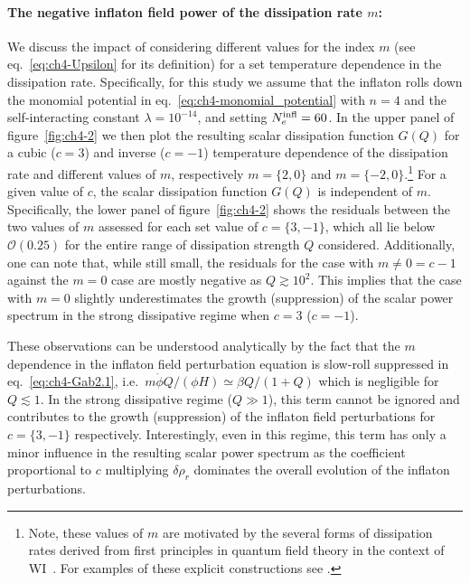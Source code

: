 \paragraph{The negative inflaton field power of the dissipation rate $m$:}
We discuss the impact of considering different values for the index $m$ (see eq.~\eqref{eq:ch4-Upsilon} for its definition) for a set temperature dependence in the dissipation rate.
Specifically, for this study we assume that the inflaton rolls down the monomial potential in eq.~\eqref{eq:ch4-monomial_potential} with $n=4$ and the self-interacting constant $\lambda=10^{-14}$, and setting $N_e^{\rm{infl}} = 60$. In the upper panel of figure~\ref{fig:ch4-2} we then plot the resulting scalar dissipation function $G(Q)$ for a cubic ($c=3$) and inverse ($c=-1$) temperature dependence of the dissipation rate and different values of $m$, respectively $m=\{2,0\}$ and $m=\{-2,0\}$.\footnote{Note, these values of $m$ are motivated by the several forms of dissipation rates derived from first principles in quantum field theory in the context of WI~\cite{Kamali:2023lzq}. For examples of these explicit constructions see \cite{Berera:1998gx,Berera:1998px,Bastero-Gil:2012akf,Berghaus:2019whh}.} For a given value of $c$, the scalar dissipation function $G(Q)$ is independent of $m$. Specifically, the lower panel of figure~\ref{fig:ch4-2} shows the residuals between the two values of $m$ assessed for each set value of $c=\{3,-1\}$, which all lie below $ \mathcal{O}(0.25)$ for the entire range of dissipation strength $Q$ considered. Additionally, one can note that, while still small, the residuals for the case with $m\neq0=c-1$ against the $m=0$ case are mostly negative as $Q\gtrsim 10^{2}$. This implies that the case with $m=0$ slightly underestimates the growth (suppression) of the scalar power spectrum in the strong dissipative regime when $c=3$ ($c=-1$).

These observations can be understood analytically by the fact that the $m$ dependence in the inflaton field perturbation equation is slow-roll suppressed in eq.~\eqref{eq:ch4-Gab2.1}, i.e.\ $m\dot{\phi} Q/(\phi H)\simeq \beta Q/(1+Q)$ which is negligible for $Q\lesssim 1$. In the strong dissipative regime ($Q\gg 1$), this term cannot be ignored and contributes to the growth (suppression) of the inflaton field perturbations for $c=\{3,-1\}$ respectively. Interestingly, even in this regime, this term has only a minor influence in the resulting scalar power spectrum as the coefficient proportional to $c$ multiplying $\delta\hat\rho_r$ dominates the overall evolution of the inflaton perturbations. 


